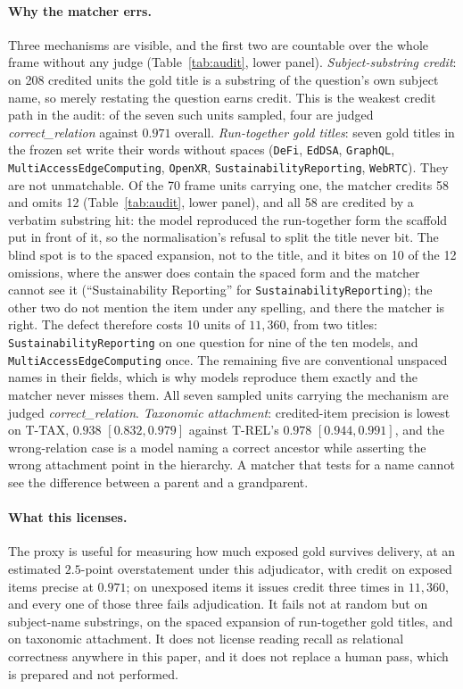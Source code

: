 \documentclass[10pt,twocolumn]{article}
\begin{document}
\paragraph{Why the matcher errs.} Three mechanisms are visible, and the first two are countable over the whole frame without any judge (Table~\ref{tab:audit}, lower panel). \emph{Subject-substring credit}: on 208 credited units the gold title is a substring of the question's own subject name, so merely restating the question earns credit. This is the weakest credit path in the audit: of the seven such units sampled, four are judged \emph{correct\_relation} against $0.971$ overall. \emph{Run-together gold titles}: seven gold titles in the frozen set write their words without spaces (\texttt{DeFi}, \texttt{EdDSA}, \texttt{GraphQL}, \texttt{MultiAccessEdgeComputing}, \texttt{OpenXR}, \texttt{SustainabilityReporting}, \texttt{WebRTC}). They are not unmatchable. Of the 70 frame units carrying one, the matcher credits 58 and omits 12 (Table~\ref{tab:audit}, lower panel), and all 58 are credited by a verbatim substring hit: the model reproduced the run-together form the scaffold put in front of it, so the normalisation's refusal to split the title never bit. The blind spot is to the spaced expansion, not to the title, and it bites on 10 of the 12 omissions, where the answer does contain the spaced form and the matcher cannot see it (``Sustainability Reporting'' for \texttt{SustainabilityReporting}); the other two do not mention the item under any spelling, and there the matcher is right. The defect therefore costs 10 units of $11{,}360$, from two titles: \texttt{SustainabilityReporting} on one question for nine of the ten models, and \texttt{MultiAccessEdgeComputing} once. The remaining five are conventional unspaced names in their fields, which is why models reproduce them exactly and the matcher never misses them. All seven sampled units carrying the mechanism are judged \emph{correct\_relation}. \emph{Taxonomic attachment}: credited-item precision is lowest on T-TAX, $0.938$ $[0.832,0.979]$ against T-REL's $0.978$ $[0.944,0.991]$, and the wrong-relation case is a model naming a correct ancestor while asserting the wrong attachment point in the hierarchy. A matcher that tests for a name cannot see the difference between a parent and a grandparent.

\paragraph{What this licenses.} The proxy is useful for measuring how much exposed gold survives delivery, at an estimated $2.5$-point overstatement under this adjudicator, with credit on exposed items precise at $0.971$; on unexposed items it issues credit three times in $11{,}360$, and every one of those three fails adjudication. It fails not at random but on subject-name substrings, on the spaced expansion of run-together gold titles, and on taxonomic attachment. It does not license reading recall as relational correctness anywhere in this paper, and it does not replace a human pass, which is prepared and not performed.
\end{document}
